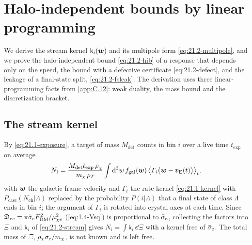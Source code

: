 \section{Halo-independent bounds by linear programming}\label{app:D.46}

We derive the stream kernel $\mathsf{k}_i(\bm{w})$ and its multipole form \cref{eq:21.2-multipole}, and we prove the halo-independent bound \cref{eq:21.2-hib} of a response that depends only on the speed, the bound with a defective certificate \cref{eq:21.2-defect}, and the leakage of a final-state split, \cref{eq:21.2-fsleak}. The derivation uses three linear-programming facts from \cref{app:C.12}: weak duality, the mass bound and the discretization bracket.

\subsection{The stream kernel}

By \cref{eq:21.1-exposure}, a target of mass $M_{\mathrm{det}}$ counts in bin $i$ over a live time $t_{\mathrm{exp}}$ on average
\begin{equation*}
  N_i = \frac{M_{\mathrm{det}}t_{\mathrm{exp}}\,\rho_\chi}{m_{\chi}\,\rho_T}\int\mathrm{d}^3w\,f_{\mathrm{gal}}(\bm{w})\,\bigl\langle\varGamma_i\bigl(\bm{w} - \bm{v}_{\mathrm{E}}(t)\bigr)\bigr\rangle_t ,
\end{equation*}
with $\bm{w}$ the galactic-frame velocity and $\varGamma_i$ the rate kernel \cref{eq:21.1-kernel} with $P_{\mathrm{casc}}(N_{\mathrm{eh}}|\Lambda)$ replaced by the probability $P(i|\Lambda)$ that a final state of class $\Lambda$ ends in bin $i$; the argument of $\varGamma_i$ is rotated into crystal axes at each time. Since $\mathfrak{D}_{ee} = \pi\bar{\sigma}_{e}F_{\mathrm{DM}}^2/\mu_{\chi e}^2$ (\cref{eq:1.4-Vsq}) is proportional to $\bar{\sigma}_{e}$, collecting the factors into $\Xi$ and $\mathsf{k}_i$ of \cref{eq:21.2-stream} gives $N_i = \int\mathsf{k}_i\,\dd\Xi$ with a kernel free of $\bar{\sigma}_{e}$. The total mass of $\Xi$, $\rho_\chi\bar{\sigma}_{e}/m_{\chi}$, is not known and is left free.

